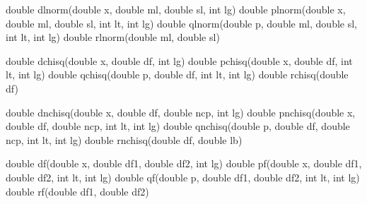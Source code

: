 \documentclass[]{book}
\newenvironment{Shaded}{\begin{snugshade}}{\end{snugshade}}
\newcommand{\DataTypeTok}[1]{\textcolor[rgb]{0.13,0.29,0.53}{#1}}
\newcommand{\NormalTok}[1]{#1}
\begin{document}
\begin{Shaded}
\begin{Highlighting}[]
\DataTypeTok{double}\NormalTok{ dlnorm(}\DataTypeTok{double}\NormalTok{ x, }\DataTypeTok{double}\NormalTok{ ml, }\DataTypeTok{double}\NormalTok{ sl, }\DataTypeTok{int}\NormalTok{ lg)    }
\DataTypeTok{double}\NormalTok{ plnorm(}\DataTypeTok{double}\NormalTok{ x, }\DataTypeTok{double}\NormalTok{ ml, }\DataTypeTok{double}\NormalTok{ sl, }\DataTypeTok{int}\NormalTok{ lt, }\DataTypeTok{int}\NormalTok{ lg) }
\DataTypeTok{double}\NormalTok{ qlnorm(}\DataTypeTok{double}\NormalTok{ p, }\DataTypeTok{double}\NormalTok{ ml, }\DataTypeTok{double}\NormalTok{ sl, }\DataTypeTok{int}\NormalTok{ lt, }\DataTypeTok{int}\NormalTok{ lg) }
\DataTypeTok{double}\NormalTok{ rlnorm(}\DataTypeTok{double}\NormalTok{ ml, }\DataTypeTok{double}\NormalTok{ sl)}

\DataTypeTok{double}\NormalTok{ dchisq(}\DataTypeTok{double}\NormalTok{ x, }\DataTypeTok{double}\NormalTok{ df, }\DataTypeTok{int}\NormalTok{ lg)          }
\DataTypeTok{double}\NormalTok{ pchisq(}\DataTypeTok{double}\NormalTok{ x, }\DataTypeTok{double}\NormalTok{ df, }\DataTypeTok{int}\NormalTok{ lt, }\DataTypeTok{int}\NormalTok{ lg)  }
\DataTypeTok{double}\NormalTok{ qchisq(}\DataTypeTok{double}\NormalTok{ p, }\DataTypeTok{double}\NormalTok{ df, }\DataTypeTok{int}\NormalTok{ lt, }\DataTypeTok{int}\NormalTok{ lg)  }
\DataTypeTok{double}\NormalTok{ rchisq(}\DataTypeTok{double}\NormalTok{ df)                            }

\DataTypeTok{double}\NormalTok{ dnchisq(}\DataTypeTok{double}\NormalTok{ x, }\DataTypeTok{double}\NormalTok{ df, }\DataTypeTok{double}\NormalTok{ ncp, }\DataTypeTok{int}\NormalTok{ lg)          }
\DataTypeTok{double}\NormalTok{ pnchisq(}\DataTypeTok{double}\NormalTok{ x, }\DataTypeTok{double}\NormalTok{ df, }\DataTypeTok{double}\NormalTok{ ncp, }\DataTypeTok{int}\NormalTok{ lt, }\DataTypeTok{int}\NormalTok{ lg)  }
\DataTypeTok{double}\NormalTok{ qnchisq(}\DataTypeTok{double}\NormalTok{ p, }\DataTypeTok{double}\NormalTok{ df, }\DataTypeTok{double}\NormalTok{ ncp, }\DataTypeTok{int}\NormalTok{ lt, }\DataTypeTok{int}\NormalTok{ lg)  }
\DataTypeTok{double}\NormalTok{ rnchisq(}\DataTypeTok{double}\NormalTok{ df, }\DataTypeTok{double}\NormalTok{ lb)                             }

\DataTypeTok{double}\NormalTok{ df(}\DataTypeTok{double}\NormalTok{ x, }\DataTypeTok{double}\NormalTok{ df1, }\DataTypeTok{double}\NormalTok{ df2, }\DataTypeTok{int}\NormalTok{ lg)     }
\DataTypeTok{double}\NormalTok{ pf(}\DataTypeTok{double}\NormalTok{ x, }\DataTypeTok{double}\NormalTok{ df1, }\DataTypeTok{double}\NormalTok{ df2, }\DataTypeTok{int}\NormalTok{ lt, }\DataTypeTok{int}\NormalTok{ lg) }
\DataTypeTok{double}\NormalTok{ qf(}\DataTypeTok{double}\NormalTok{ p, }\DataTypeTok{double}\NormalTok{ df1, }\DataTypeTok{double}\NormalTok{ df2, }\DataTypeTok{int}\NormalTok{ lt, }\DataTypeTok{int}\NormalTok{ lg) }
\DataTypeTok{double}\NormalTok{ rf(}\DataTypeTok{double}\NormalTok{ df1, }\DataTypeTok{double}\NormalTok{ df2)               }


\end{Highlighting}
\end{Shaded}
\end{document}
